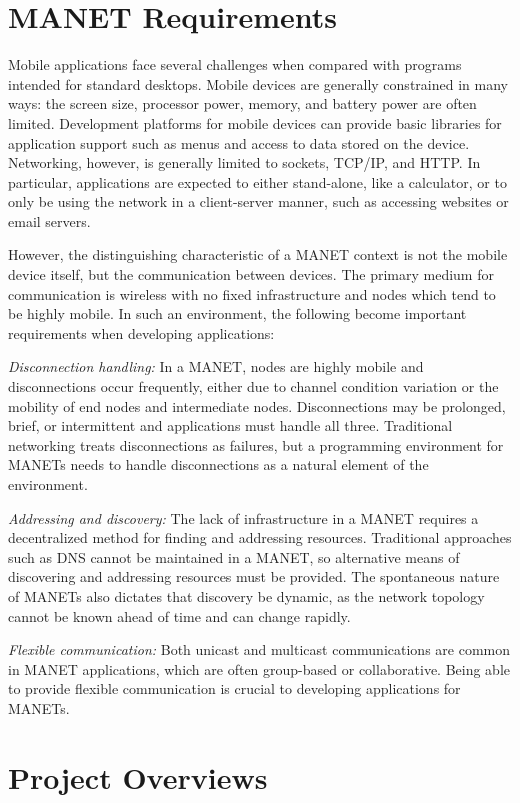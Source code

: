 \documentclass{sig-alternate}
\begin{document}
\section{MANET Requirements}

Mobile applications face several challenges when compared with programs intended for standard desktops. Mobile devices are generally constrained in many ways: the screen size, processor power, memory, and battery power are often limited. Development platforms for mobile devices can provide basic libraries for application support such as menus and access to data stored on the device. Networking, however, is generally limited to sockets, TCP/IP, and HTTP. In particular, applications are expected to either stand-alone, like a calculator, or to only be using the network in a client-server manner, such as accessing websites or email servers.

However, the distinguishing characteristic of a MANET context is not the mobile device itself,  but the communication between devices. The primary medium for communication is wireless with no fixed infrastructure and nodes which tend to be highly mobile. In such an environment, the following become important requirements when developing applications:

\textit{Disconnection handling:} In a MANET, nodes are highly mobile and disconnections occur frequently, either due to channel condition variation or the mobility of end nodes and intermediate nodes. Disconnections may be prolonged, brief, or intermittent and applications must handle all three. Traditional networking treats disconnections as failures, but a programming environment for MANETs needs to handle disconnections as a natural element of the environment.

\textit{Addressing and discovery:} The lack of infrastructure in a MANET requires a decentralized method for finding and addressing resources. Traditional approaches such as DNS cannot be maintained in a MANET, so alternative means of discovering and addressing resources must be provided. The spontaneous nature of MANETs also dictates that discovery be dynamic, as the network topology cannot be known ahead of time and can change rapidly.

\textit{Flexible communication:} Both unicast and multicast communications are common in MANET applications, which are often group-based or collaborative. Being able to provide flexible communication is crucial to developing applications for MANETs.

\section{Project Overviews}
\end{document}
